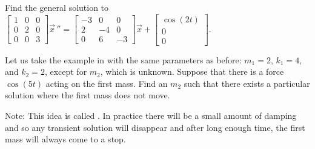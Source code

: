 \documentclass{ximera}
\begin{document}
\begin{exercise}%
    Find the general solution to
    $\left[ \begin{smallmatrix}
        1 & 0 & 0\\
        0 & 2 & 0\\
        0 & 0 & 3
    \end{smallmatrix}\right]
    \vec{x}\,'' =
    \left[ \begin{smallmatrix}
        -3 & 0 & 0 \\
        2 & -4 & 0 \\
        0 & 6 & -3
    \end{smallmatrix}\right]
    \vec{x} + 
    \left[ \begin{smallmatrix}
        \cos(2t) \\ 
        0 \\ 
        0
    \end{smallmatrix}\right]$.
\end{exercise}

\begin{exercise}%
    Let us take the example in  with the same parameters as before: $m_1 = 2$, $k_1 = 4$, and $k_2 = 2$, except for $m_2$, which is unknown. Suppose that there is a force $\cos (5 t)$ acting on the first mass. Find an $m_2$ such that there exists a particular solution where the first mass does not move.
    
    Note: This idea is called \emph{}. In practice there will be a small amount of damping and so any transient solution will disappear and after long enough time, the first mass will always come to a stop.
\end{exercise}
\end{document}
